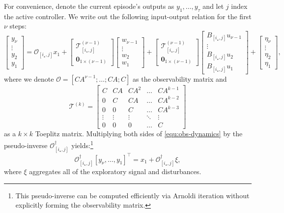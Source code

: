 \documentclass[11pt, twoside]{article}
\theoremstyle{definition}
\newcommand{\tbo}[2]{\begin{bmatrix}#1 \\ #2\end{bmatrix}}
\begin{document}
For convenience, denote the current episode's outputs as $y_1, \dots, y_\tau$ and let $j$ index the active controller.
We write out the following input-output relation for the first $\nu$ steps:
\begin{equation}
\label{equ:obs-dynamics}
\begin{bmatrix} y_\nu \\ \vdots \\y_2 \\ y_1 \end{bmatrix}
=
\mathcal{O}_{[i_\star, j]} x_1
+
\tbo{\mathcal{T}^{(\nu-1)}_{[i_\star, j]}}{\mathbf{0}_{1 \times (\nu-1)}}
\begin{bmatrix} w_{\nu-1} \\ \vdots \\w_2 \\ w_1  \end{bmatrix}
+
\tbo{\mathcal{T}^{(\nu-1)}_{[i_\star, j]}}{\mathbf{0}_{1 \times (\nu-1)}}
\begin{bmatrix} B_{[i_\star, j]}u_{\nu-1} \\ \vdots \\ B_{[i_\star, j]}u_2 \\ B_{[i_\star, j]}u_1  \end{bmatrix}
+
\begin{bmatrix} \eta_\nu \\ \vdots \\ \eta_2 \\ \eta_1  \end{bmatrix},
\end{equation}
where we denote $\mathcal{O} = [CA^{\nu-1}; \dots; CA; C]$ as the observability matrix and
\[\mathcal{T}^{(k)} = \begin{bmatrix} 
    C & CA & CA^2 & \dots & CA^{k-1} \\
    0 & C & CA & \dots & CA^{k-2} \\
    0 & 0 & C & \dots & CA^{k-3}\\
    \vdots & \vdots & \vdots & \ddots & \vdots \\
    0 & 0 & 0 & \dots & C
\end{bmatrix}\]
as a $k \times k$ Toeplitz matrix.
Multiplying both sides of \eqref{equ:obs-dynamics} by the pseudo-inverse $\mathcal{O}_{[i_\star, j]}^\dagger$ yields:\footnote{This pseudo-inverse can be computed efficiently via Arnoldi iteration without explicitly forming the observability matrix.}
\begin{equation}
\label{equ:obs-dynamics-short}
    \mathcal{O}_{[i_\star, j]}^\dagger [y_\nu, \dots, y_1]^\top = x_1 + \mathcal{O}_{[i_\star, j]}^\dagger \xi,
\end{equation}
where $\xi$ aggregates all of the exploratory signal and disturbances.
\end{document}
